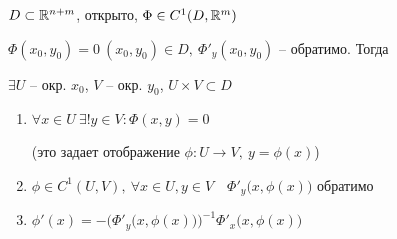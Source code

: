     \begin{theorem}
        $D \subset \mathbb{R}^{n+m}$, открыто, $\Phi \in C^1(D, \mathbb{R}^m)$
        \par $\Phi(x_0, y_0) = 0 \ (x_0, y_0) \in D, \ \Phi'_y(x_0, y_0)$ -- обратимо. Тогда
        \par $\exists U$ -- окр. $x_0$, $V$ -- окр. $y_0$, $U \times V  \subset D$
        \begin{enumerate}
            \item $\forall x \in U \ \exists! y \in V : \Phi(x, y) = 0$
            \par (это задает отображение $\phi : U \rightarrow V, \ y = \phi(x)$)
            \item $\phi \in C^1(U, V), \ \forall x \in U, y \in V \quad \Phi'_y\big(x, \phi(x)\big)$ обратимо
            \item $\phi'(x) = -\Big(\Phi'_y\big(x, \phi(x)\big)\Big)^{-1} \Phi'_x\big(x, \phi(x)\big)$
        \end{enumerate}
    \end{theorem}

